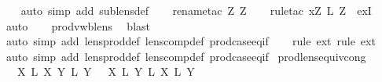 \begin{isabellebody}
%
\isadelimproof
\ \ %
\endisadelimproof
%
\isatagproof
{}\isamarkupfalse%
\ {\isacharparenleft}auto\ simp\ add{\isacharcolon}\ sublens{\isacharunderscore}def{\isacharparenright}\isanewline
\ \ \isamarkupfalse%
\ {\isacharparenleft}rename{\isacharunderscore}tac\ Z\ Z\isanewline
\ \ \isamarkupfalse%
\ {\isacharparenleft}rule{\isacharunderscore}tac\ x{\isacharequal}{\isachardoublequoteopen}Z\ {\isasymtimes}\isactrlsub L\ Z\ \ exI{\isacharparenright}\isanewline
\ \ \isamarkupfalse%
\ {\isacharparenleft}auto{\isacharparenright}\isanewline
\ \ \isamarkupfalse%
\ prod{\isacharunderscore}vwb{\isacharunderscore}lens\ \isamarkupfalse%
\ blast\isanewline
\ \ \isamarkupfalse%
\ {\isacharparenleft}auto\ simp\ add{\isacharcolon}\ lens{\isacharunderscore}prod{\isacharunderscore}def\ lens{\isacharunderscore}comp{\isacharunderscore}def\ prod{\isachardot}case{\isacharunderscore}eq{\isacharunderscore}if{\isacharparenright}\isanewline
\ \ \isamarkupfalse%
\ {\isacharparenleft}rule\ ext{\isacharcomma}\ rule\ ext{\isacharparenright}\isanewline
\ \ \isamarkupfalse%
\ {\isacharparenleft}auto\ simp\ add{\isacharcolon}\ lens{\isacharunderscore}prod{\isacharunderscore}def\ lens{\isacharunderscore}comp{\isacharunderscore}def\ prod{\isachardot}case{\isacharunderscore}eq{\isacharunderscore}if{\isacharparenright}\isanewline
{}\isamarkupfalse%
%
\endisatagproof
{\isafoldproof}%
%
\isadelimproof
\isanewline
%
\endisadelimproof
\isanewline
{}\isamarkupfalse%
\ prod{\isacharunderscore}lens{\isacharunderscore}equiv{\isacharunderscore}cong{\isacharcolon}\isanewline
\ \ {\isachardoublequoteopen}{\isasymlbrakk}\ X\ {\isasymapprox}\isactrlsub L\ X\ Y\ {\isasymapprox}\isactrlsub L\ Y\ {\isasymrbrakk}\ {\isasymLongrightarrow}\ {\isacharparenleft}X\ {\isasymtimes}\isactrlsub L\ Y\ {\isasymapprox}\isactrlsub L\ {\isacharparenleft}X\ {\isasymtimes}\isactrlsub L\ Y\isanewline
%
\isadelimproof
\ \ %
\endisadelimproof
%
\isatagproof
{}\isamarkupfalse%

\end{isabellebody}
